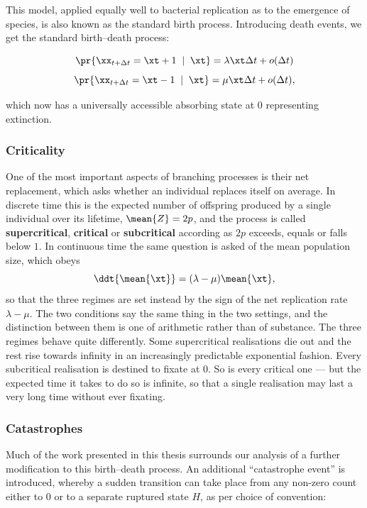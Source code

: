 This model, applied equally well to bacterial replication as to the emergence
of species, is also known as the standard birth process. Introducing death
events, we get the standard birth--death process:

$$\pr{\xx_{t + \Delta t}  = \xt + 1 \;\; | \;\; \xt} = \lambda \xt \Delta t + o(\Delta t)$$
$$\pr{\xx_{t + \Delta t}  = \xt - 1 \;\; | \;\; \xt} = \mu \xt \Delta t + o(\Delta t),$$

\noindent
which now has a universally accessible absorbing state at $0$ representing
extinction.

\subsubsection*{Criticality}

One of the most important aspects of branching processes is their net
replacement, which asks whether an individual replaces itself on average. In
discrete time this is the expected number of offspring produced by a single
individual over its lifetime, $\mean{Z}=2p$, and the process is called
\textbf{supercritical}, \textbf{critical} or \textbf{subcritical} according as
$2p$ exceeds, equals or falls below $1$. In continuous time the same question
is asked of the mean population size, which obeys
$$\ddt{\mean{\xt}} = (\lambda - \mu) \mean{\xt},$$
so that the three regimes are set instead by the sign of the net replication
rate $\lambda-\mu$. The two conditions say the same thing in the two settings,
and the distinction between them is one of arithmetic rather than of substance.
The three regimes behave quite differently. Some supercritical realisations die
out and the rest rise towards infinity in an increasingly predictable
exponential fashion. Every subcritical realisation is destined to fixate at
$0$. So is every critical one --- but the expected time it takes to do so is
infinite, so that a single realisation may last a very long time without ever
fixating.

\subsubsection*{Catastrophes}

Much of the work presented in this thesis surrounds our analysis of a further
modification to this birth--death process. An additional ``catastrophe event''
is introduced, whereby a sudden transition can take place from any non-zero
count either to $0$ or to a separate ruptured state $H$, as per choice of
convention:

